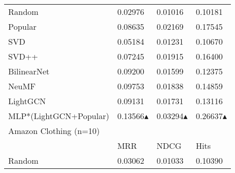 \begin{tabular}{llll}
 Random                & 0.02976                                                & 0.01016                                                & 0.10181                                                \\
 Popular               & 0.08635                                                & 0.02169                                                & 0.17545                                                \\
 SVD                   & 0.05184                                                & 0.01231                                                & 0.10670                                                \\
 SVD++                 & 0.07245                                                & 0.01915                                                & 0.16400                                                \\
 BilinearNet           & 0.09200                                                & 0.01599                                                & 0.12375                                                \\
 NeuMF                 & 0.09753                                                & 0.01838                                                & 0.14859                                                \\
 LightGCN              & 0.09131                                                & 0.01731                                                & 0.13116                                                \\
 MLP*(LightGCN+Popular) & 0.13566\textcolor[rgb]{00,0.45,0.10}{$\blacktriangle$} & 0.03294\textcolor[rgb]{00,0.45,0.10}{$\blacktriangle$} & 0.26637\textcolor[rgb]{00,0.45,0.10}{$\blacktriangle$} \\\hline
 Amazon Clothing (n=10)   &                                                        &                                                        &                                                        \\\hline
                       & MRR                                                    & NDCG                                                   & Hits                                                   \\\hline
 Random                & 0.03062                                                & 0.01033                                                & 0.10390                                                \\

\end{tabular}
